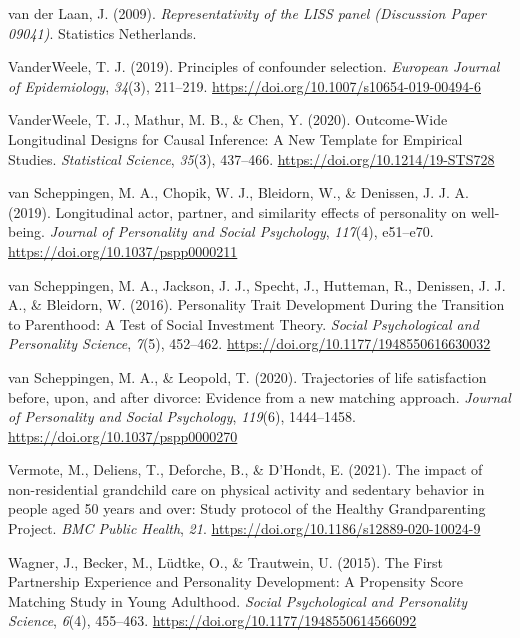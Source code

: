 \documentclass[
  english,
  man, noextraspace]{apa7}
\begin{document}
\leavevmode\hypertarget{ref-vanderlaanRepresentativityLISSPanel2009}{}%
van der Laan, J. (2009). \emph{Representativity of the LISS panel (Discussion Paper 09041)}. Statistics Netherlands.

\leavevmode\hypertarget{ref-vanderweelePrinciplesConfounderSelection2019}{}%
VanderWeele, T. J. (2019). Principles of confounder selection. \emph{European Journal of Epidemiology}, \emph{34}(3), 211--219. \url{https://doi.org/10.1007/s10654-019-00494-6}

\leavevmode\hypertarget{ref-vanderweeleOutcomeWideLongitudinalDesigns2020}{}%
VanderWeele, T. J., Mathur, M. B., \& Chen, Y. (2020). Outcome-Wide Longitudinal Designs for Causal Inference: A New Template for Empirical Studies. \emph{Statistical Science}, \emph{35}(3), 437--466. \url{https://doi.org/10.1214/19-STS728}

\leavevmode\hypertarget{ref-vanscheppingenLongitudinalActorPartner2019}{}%
van Scheppingen, M. A., Chopik, W. J., Bleidorn, W., \& Denissen, J. J. A. (2019). Longitudinal actor, partner, and similarity effects of personality on well-being. \emph{Journal of Personality and Social Psychology}, \emph{117}(4), e51--e70. \url{https://doi.org/10.1037/pspp0000211}

\leavevmode\hypertarget{ref-vanscheppingenPersonalityTraitDevelopment2016}{}%
van Scheppingen, M. A., Jackson, J. J., Specht, J., Hutteman, R., Denissen, J. J. A., \& Bleidorn, W. (2016). Personality Trait Development During the Transition to Parenthood: A Test of Social Investment Theory. \emph{Social Psychological and Personality Science}, \emph{7}(5), 452--462. \url{https://doi.org/10.1177/1948550616630032}

\leavevmode\hypertarget{ref-vanscheppingenTrajectoriesLifeSatisfaction2020}{}%
van Scheppingen, M. A., \& Leopold, T. (2020). Trajectories of life satisfaction before, upon, and after divorce: Evidence from a new matching approach. \emph{Journal of Personality and Social Psychology}, \emph{119}(6), 1444--1458. \url{https://doi.org/10.1037/pspp0000270}

\leavevmode\hypertarget{ref-vermoteImpactNonresidentialGrandchild2021a}{}%
Vermote, M., Deliens, T., Deforche, B., \& D'Hondt, E. (2021). The impact of non-residential grandchild care on physical activity and sedentary behavior in people aged 50 years and over: Study protocol of the Healthy Grandparenting Project. \emph{BMC Public Health}, \emph{21}. \url{https://doi.org/10.1186/s12889-020-10024-9}

\leavevmode\hypertarget{ref-wagnerFirstPartnershipExperience2015}{}%
Wagner, J., Becker, M., Lüdtke, O., \& Trautwein, U. (2015). The First Partnership Experience and Personality Development: A Propensity Score Matching Study in Young Adulthood. \emph{Social Psychological and Personality Science}, \emph{6}(4), 455--463. \url{https://doi.org/10.1177/1948550614566092}
\end{document}
